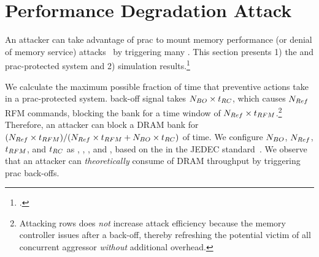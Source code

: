 \section{Performance Degradation Attack}
\label{sec:evaluation_dos}

An attacker can take advantage of  \gls{prac} to mount memory performance (or denial of memory service) attacks~\cite{mutlu2007memory} by triggering many .
This section presents
1) the  \X{} and \gls{prac}-protected system and
2) simulation results.\footnote{.}

We calculate the maximum possible fraction of  time that preventive actions take in a \gls{prac}-protected system.
 back-off signal takes $N_{BO}\times t_{RC}$, which causes $N_{Ref}$ RFM commands, blocking the bank for a time window of $N_{Ref}\times t_{RFM}$.\footnote{Attacking rows  does \emph{not} increase attack efficiency because the memory controller issues  after a back-off, thereby refreshing the potential victim  of all concurrent aggressor  \emph{without} additional overhead.}
Therefore, an attacker can block a DRAM bank for $(N_{Ref}\times t_{RFM})/(N_{Ref}\times t_{RFM}+N_{BO}\times t_{RC})$ of time.
We configure $N_{BO}$, $N_{Ref}$, $t_{RFM}$, and $t_{RC}$ as , , , and   , based on the   in the JEDEC standard~\cite{jedec2024jesd795c}.
We observe that an attacker can \emph{theoretically} consume  of DRAM throughput by triggering \gls{prac} back-offs.


